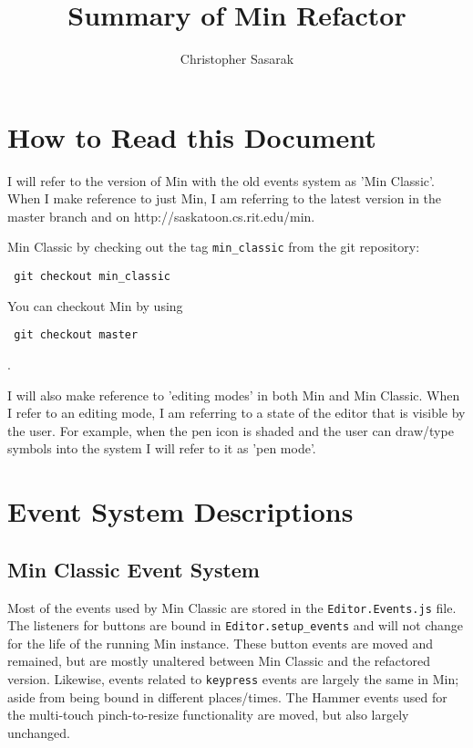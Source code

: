 \documentclass[letterpaper]{article}
\begin{document}
\author{Christopher Sasarak}
\title{Summary of Min Refactor}

\maketitle

\section*{How to Read this Document}


I will refer to the version of Min with the old events system as 'Min Classic'.
When I make reference to just Min, I am referring to the latest version in the
master branch and on http://saskatoon.cs.rit.edu/min.

Min Classic by checking out the tag \verb+min_classic+ from the git repository:
\begin{verbatim} git checkout min_classic \end{verbatim} You can checkout Min by
using \begin{verbatim} git checkout master \end{verbatim}.

I will also make reference to 'editing modes' in both Min and Min Classic.
When I refer to an editing mode, I am referring to a state of the editor that is
visible by the user. For example, when the pen icon is shaded and the user can
draw/type symbols into the system I will refer to it as 'pen mode'.

\section*{Event System Descriptions}

\subsection*{Min Classic Event System} 
Most of the events used by Min Classic are stored in the \verb+Editor.Events.js+ file. 
The listeners for buttons are bound in \verb+Editor.setup_events+ and will not
change for the life of the running Min instance. These button events are moved
and remained, but are mostly unaltered between Min Classic and the refactored
version. Likewise, events related to \verb+keypress+ events are largely the
same in Min; aside from being bound in different places/times. The Hammer events
used for the multi-touch pinch-to-resize functionality are moved, but also largely
unchanged.
\end{document}
